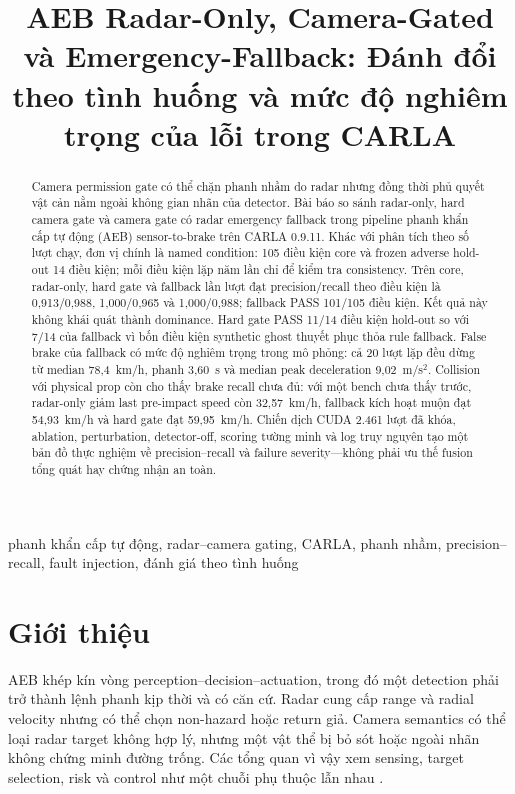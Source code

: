 \documentclass[conference]{IEEEtran}
\title{AEB Radar-Only, Camera-Gated và Emergency-Fallback: Đánh đổi theo tình huống và mức độ nghiêm trọng của lỗi trong CARLA}
\author{
\IEEEauthorblockN{Mai Việt Hoàng và Phạm Đức An}
\IEEEauthorblockA{\textit{Đại học Bách khoa Hà Nội}\\
Hà Nội, Việt Nam\\hoangmai04222@gmail.com}
}
\begin{document}
\maketitle

\begin{abstract}
Camera permission gate có thể chặn phanh nhầm do radar nhưng đồng thời phủ quyết
vật cản nằm ngoài không gian nhãn của detector. Bài báo so sánh radar-only, hard
camera gate và camera gate có radar emergency fallback trong pipeline phanh khẩn
cấp tự động (AEB) sensor-to-brake trên CARLA 0.9.11. Khác với phân tích theo số
lượt chạy, đơn vị chính là named condition: 105 điều kiện core và frozen adverse
hold-out 14 điều kiện; mỗi điều kiện lặp năm lần chỉ để kiểm tra consistency.
Trên core, radar-only, hard gate và fallback lần lượt đạt precision/recall theo
điều kiện là 0,913/0,988, 1,000/0,965 và 1,000/0,988; fallback PASS 101/105 điều
kiện. Kết quả này không khái quát thành dominance. Hard gate PASS 11/14 điều
kiện hold-out so với 7/14 của fallback vì bốn điều kiện synthetic ghost thuyết
phục thỏa rule fallback. False brake của fallback có mức độ nghiêm trọng trong
mô phỏng: cả 20 lượt lặp đều dừng từ median 78,4~km/h, phanh 3,60~s và median
peak deceleration 9,02~m/s$^2$. Collision với physical prop còn cho thấy brake
recall chưa đủ: với một bench chưa thấy trước, radar-only giảm last pre-impact
speed còn 32,57~km/h, fallback kích hoạt muộn đạt 54,93~km/h và hard gate đạt
59,95~km/h. Chiến dịch CUDA 2.461 lượt đã khóa, ablation, perturbation,
detector-off, scoring tường minh và log truy nguyên tạo một bản đồ thực nghiệm
về precision--recall và failure severity---không phải ưu thế fusion tổng quát
hay chứng nhận an toàn.
\end{abstract}

\begin{IEEEkeywords}
phanh khẩn cấp tự động, radar--camera gating, CARLA, phanh nhầm,
precision--recall, fault injection, đánh giá theo tình huống
\end{IEEEkeywords}

\section{Giới thiệu}
AEB khép kín vòng perception--decision--actuation, trong đó một detection phải
trở thành lệnh phanh kịp thời và có căn cứ. Radar cung cấp range và radial
velocity nhưng có thể chọn non-hazard hoặc return giả. Camera semantics có thể
loại radar target không hợp lý, nhưng một vật thể bị bỏ sót hoặc ngoài nhãn không
chứng minh đường trống. Các tổng quan vì vậy xem sensing, target selection, risk
và control như một chuỗi phụ thuộc lẫn nhau \cite{yang2022aebreview}.
\end{document}

